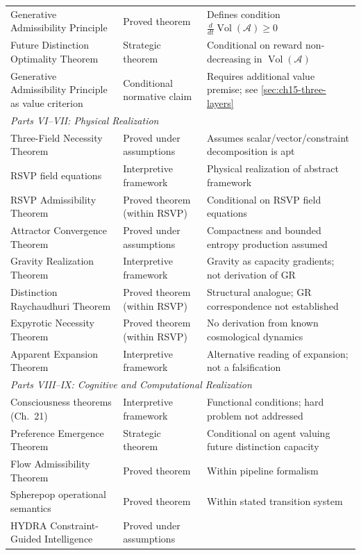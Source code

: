 \documentclass[12pt,twoside,openright]{book}
\newcommand{\adm}{\mathcal{A}}
\newcommand{\Vol}{\operatorname{Vol}}
\begin{document}
\begin{center}
\begin{tabular}{p{5.5cm}lp{5cm}}
Generative Admissibility Principle & Proved theorem &
  Defines condition $\frac{d}{dt}\Vol(\adm) \ge 0$ \\
Future Distinction Optimality Theorem & Strategic theorem &
  Conditional on reward non-decreasing in $\Vol(\adm)$ \\
Generative Admissibility Principle as value criterion
  & Conditional normative claim &
  Requires additional value premise; see \cref{sec:ch15-three-layers} \\
\midrule
\multicolumn{3}{l}{\itshape Parts VI--VII: Physical Realization} \\[2pt]
Three-Field Necessity Theorem & Proved under assumptions &
  Assumes scalar/vector/constraint decomposition is apt \\
RSVP field equations & Interpretive framework &
  Physical realization of abstract framework \\
RSVP Admissibility Theorem & Proved theorem (within RSVP) &
  Conditional on RSVP field equations \\
Attractor Convergence Theorem & Proved under assumptions &
  Compactness and bounded entropy production assumed \\
Gravity Realization Theorem & Interpretive framework &
  Gravity as capacity gradients; not derivation of GR \\
Distinction Raychaudhuri Theorem & Proved theorem (within RSVP) &
  Structural analogue; GR correspondence not established \\
Expyrotic Necessity Theorem & Proved theorem (within RSVP) &
  No derivation from known cosmological dynamics \\
Apparent Expansion Theorem & Interpretive framework &
  Alternative reading of expansion; not a falsification \\
\midrule
\multicolumn{3}{l}{\itshape Parts VIII--IX: Cognitive and Computational Realization} \\[2pt]
Consciousness theorems (Ch.\ 21) & Interpretive framework &
  Functional conditions; hard problem not addressed \\
Preference Emergence Theorem & Strategic theorem &
  Conditional on agent valuing future distinction capacity \\
Flow Admissibility Theorem & Proved theorem &
  Within pipeline formalism \\
Spherepop operational semantics & Proved theorem &
  Within stated transition system \\
HYDRA Constraint-Guided Intelligence & Proved under assumptions &

\end{tabular}
\end{center}
\end{document}
